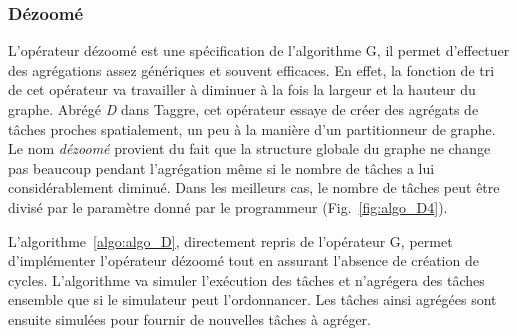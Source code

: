 \subsubsection{Dézoomé}
L'opérateur dézoomé est une spécification de l'algorithme G, il permet d'effectuer des agrégations assez génériques et souvent efficaces.
%
En effet, la fonction de tri de cet opérateur va travailler à diminuer à la fois la largeur et la hauteur du graphe.
%
Abrégé {\em D} dans Taggre, cet opérateur essaye de créer des agrégats de tâches proches spatialement, un peu à la manière d'un partitionneur de graphe.
%
Le nom {\em dézoomé} provient du fait que la structure globale du graphe ne change pas beaucoup pendant l'agrégation même si le nombre de tâches a lui considérablement diminué.
%
Dans les meilleurs cas, le nombre de tâches peut être divisé par le paramètre donné par le programmeur (Fig.~\ref{fig:algo_D4}).

L'algorithme~\ref{algo:algo_D}, directement repris de l'opérateur G, permet d'implémenter l'opérateur dézoomé tout en assurant l'absence de création de cycles.
%
L'algorithme va simuler l'exécution des tâches et n'agrégera des tâches ensemble que si le simulateur peut l'ordonnancer.
%
Les tâches ainsi agrégées sont ensuite simulées pour fournir de nouvelles tâches à agréger.

